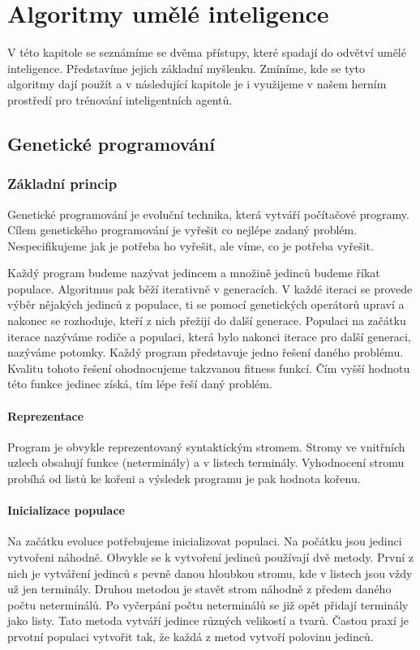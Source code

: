 \chapter{Algoritmy umělé inteligence}
V této kapitole se seznámíme se dvěma přístupy, které spadají do odvětví umělé inteligence. 
Představíme jejich základní myšlenku. Zmíníme, kde se tyto algoritmy dají použít a v následující kapitole je i využijeme v našem herním prostředí pro trénování inteligentních agentů.

\section{Genetické programování}

\subsection{Základní princip}
Genetické programování je evoluční technika, která vytváří počítačové programy. Cílem genetického programování je vyřešit co nejlépe zadaný problém.
Nespecifikujeme jak je potřeba ho vyřešit, ale víme, co je potřeba vyřešit.
\par
Každý program budeme nazývat jedincem a množině jedinců budeme říkat populace. Algoritmus pak běží iterativně v generacích. 
V každé iteraci se provede výběr nějakých jedinců z populace, ti se pomocí genetických operátorů upraví a nakonec se rozhoduje, kteří z nich přežijí do další generace.
Populaci na začátku iterace nazýváme rodiče a populaci, která bylo nakonci iterace pro další generaci, nazýváme potomky.
Každý program představuje jedno řešení daného problému. Kvalitu tohoto řešení ohodnocujeme takzvanou fitness funkcí. Čím vyšší hodnotu této funkce jedinec získá, tím lépe řeší daný problém.


\subsubsection{Reprezentace}
Program je obvykle reprezentovaný syntaktickým stromem. Stromy ve vnitřních uzlech obsahují funkce (neterminály) a v listech terminály.
Vyhodnocení stromu probíhá od listů ke kořeni a výsledek programu je pak hodnota kořenu.


\subsubsection{Inicializace populace}
Na začátku evoluce potřebujeme inicializovat populaci. Na počátku jsou jedinci vytvořeni náhodně. Obvykle se k vytvoření jedinců používají dvě metody.
První z nich je vytváření jedinců s pevně danou hloubkou stromu, kde v listech jsou vždy už jen terminály. Druhou metodou je stavět strom náhodně z předem daného počtu neterminálů.
Po vyčerpání počtu neterminálů se již opět přidají terminály jako listy. Tato metoda vytváří jedince různých velikostí a tvarů.
Častou praxí je prvotní populaci vytvořit tak, že každá z metod vytvoří polovinu jedinců. 


